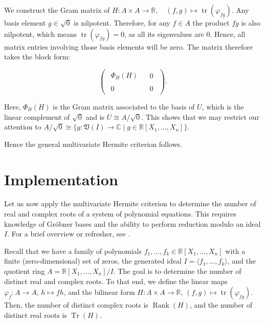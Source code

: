 \documentclass{amsart}
\begin{document}
We construct the Gram matrix of $H : A \times A \to \mathbb{R}, \quad (f,g) \mapsto \operatorname{tr}(\varphi_{fg})$. Any basis element $g \in \sqrt{0}$ is nilpotent. Therefore, for any $f \in A$ the product $fg$ is also nilpotent, which means $\operatorname{tr}(\varphi_{fg}) = 0$, as all its eigenvalues are 0. Hence, all matrix entries involving those basis elements will be zero. The matrix therefore takes the block form:

\[
\left(
\begin{array}{c|c}
\begin{matrix}
\Phi_B (H)
\end{matrix} & \begin{matrix}
0
\end{matrix} \\ \hline
\begin{matrix}
0
\end{matrix} & \begin{matrix}
0
\end{matrix}
\end{array}
\right).
\]

Here, \( \Phi_B(H) \) is the Gram matrix associated to the basis of $U$, which is the linear complement of $\sqrt{0}$ and is $U \cong A/\sqrt{0}$. This shows that we may restrict our attention to $A/\sqrt{0} \cong \{g : \mathfrak{V}(I) \to \mathbb{C} \mid g \in \mathbb{R}[X_1, \ldots, X_n] \}$.

Hence the general multivariate Hermite criterion follows.

\section{Implementation}
Let us now apply the multivariate Hermite criterion to determine the number of real and complex roots of a system of polynomial equations. This requires knowledge of Gröbner bases and the ability to perform reduction modulo an ideal \( I \). For a brief overview or refresher, see \cite[Chapter~2]{cox_little_oshea2015book}.

Recall that we have a family of polynomials \(f_1, \ldots, f_k \in \mathbb{R}[X_1, \ldots, X_n]\) with a finite (zero-dimensional) set of zeros, the generated ideal \(I = \langle f_1, \ldots, f_k \rangle\), and the quotient ring \(A = \mathbb{R}[X_1, \ldots, X_n]/I\). The goal is to determine the number of distinct real and complex roots. To that end, we define the linear maps \(\varphi_f : A \to A, \, h \mapsto fh\), and the bilinear form \(H : A \times A \to \mathbb{R}, \, (f, g) \mapsto \operatorname{tr}(\varphi_{fg})\). Then, the number of distinct complex roots is \(\operatorname{Rank}(H)\), and the number of distinct real roots is \(\operatorname{Tr}(H)\).
 
\end{document}
